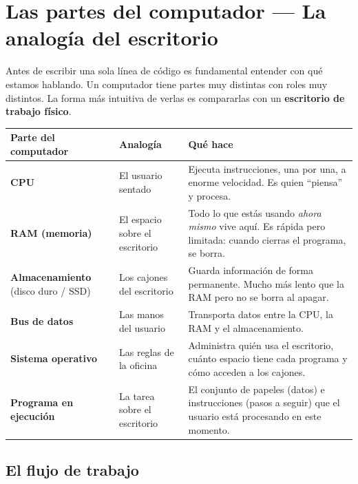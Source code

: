 \documentclass[12pt, oneside]{article}
\begin{document}
\section{Las partes del computador — La analogía del escritorio}

Antes de escribir una sola línea de código es fundamental entender con
qué estamos hablando. Un computador tiene partes muy distintas con roles
muy distintos. La forma más intuitiva de verlas es compararlas con un
\textbf{escritorio de trabajo físico}.

\begin{center}
\begin{tabular}{llp{6.5cm}}
  \toprule
  \textbf{Parte del computador} & \textbf{Analogía} & \textbf{Qué hace} \\
  \midrule
  \textbf{CPU}
    & El usuario sentado
    & Ejecuta instrucciones, una por una, a enorme velocidad.
      Es quien ``piensa'' y procesa. \\[6pt]
  \textbf{RAM (memoria)}
    & El espacio sobre el escritorio
    & Todo lo que estás usando \textit{ahora mismo} vive aquí.
      Es rápida pero limitada: cuando cierras el programa,
      se borra. \\[6pt]
  \textbf{Almacenamiento} \newline (disco duro / SSD)
    & Los cajones del escritorio
    & Guarda información de forma permanente.
      Mucho más lento que la RAM pero no se borra al apagar. \\[6pt]
  \textbf{Bus de datos}
    & Las manos del usuario
    & Transporta datos entre la CPU, la RAM y el almacenamiento. \\[6pt]
  \textbf{Sistema operativo}
    & Las reglas de la oficina
    & Administra quién usa el escritorio, cuánto espacio tiene
      cada programa y cómo acceden a los cajones. \\[6pt]
  \textbf{Programa en ejecución}
    & La tarea sobre el escritorio
    & El conjunto de papeles (datos) e instrucciones (pasos a seguir)
      que el usuario está procesando en este momento. \\
  \bottomrule
\end{tabular}
\end{center}

\subsection{El flujo de trabajo}
\end{document}
